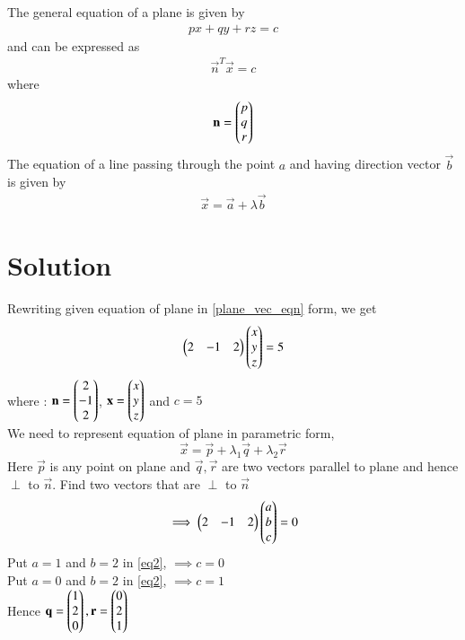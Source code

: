 \documentclass[journal,12pt,twocolumn]{IEEEtran}
\begin{document}
The general equation of a plane is given by
\begin{align}
    px+qy+rz = c \label{gen_plane_eqn}
\end{align}
and can be expressed as
\begin{align}
    \vec{n}^T\vec{x} = c \label{plane_vec_eqn}
\end{align}
where
\begin{align}
    \mathbf{n} = \begin{pmatrix}p \\ q \\ r\end{pmatrix}
\end{align}
The equation of a line passing through the point $a$ and having direction vector $\vec{b}$ is given by
\begin{align}
    \vec{x} = \vec{a} +\lambda \vec{b} \label{vec_line_eq}
\end{align}
\section{Solution}
Rewriting given equation of plane in \eqref{plane_vec_eqn} form, we get
\begin{align}\label{eq0}
	\begin{pmatrix}2 & -1 & 2\end{pmatrix}\begin{pmatrix}x\\y\\z\end{pmatrix} = 5
\end{align}
where :
$\mathbf{n}=\begin{pmatrix}2\\ -1 \\2\end{pmatrix}$, $\mathbf{x} = \begin{pmatrix}x\\y\\z\end{pmatrix}$  and $c=5$\\
We need to represent equation of plane in parametric form,
\begin{equation}\label{eq1}
	\vec{x} = \vec{p} + \lambda_1\vec{q} + \lambda_2\vec{r}
\end{equation}
Here $\vec{p}$ is any point on plane and $\vec{q}, \vec{r}$ are two vectors parallel to plane and hence $\perp$ to $\vec{n}$. Find two vectors that are $\perp$ to $\vec{n}$
\begin{align}\label{eq2}
	\implies\begin{pmatrix}2 & -1 & 2\end{pmatrix}\begin{pmatrix}a\\b\\c\end{pmatrix} = 0
\end{align}
Put $a=1$ and $b=2$ in \eqref{eq2}, $\implies c=0$\\
Put $a=0$ and $b=2$ in \eqref{eq2}, $\implies c=1$\\
Hence $\mathbf{q} = \begin{pmatrix}1\\2\\0\end{pmatrix}, \mathbf{r} = \begin{pmatrix}0\\2\\1\end{pmatrix}$\\
\end{document}
